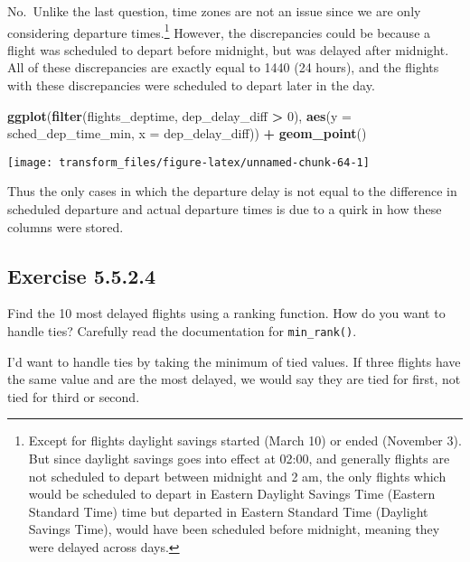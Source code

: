 \documentclass[]{book}
\newenvironment{Shaded}{\begin{snugshade}}{\end{snugshade}}
\newcommand{\DataTypeTok}[1]{\textcolor[rgb]{0.13,0.29,0.53}{#1}}
\newcommand{\DecValTok}[1]{\textcolor[rgb]{0.00,0.00,0.81}{#1}}
\newcommand{\KeywordTok}[1]{\textcolor[rgb]{0.13,0.29,0.53}{\textbf{#1}}}
\newcommand{\NormalTok}[1]{#1}
\newcommand{\OperatorTok}[1]{\textcolor[rgb]{0.81,0.36,0.00}{\textbf{#1}}}
\newcommand{\StringTok}[1]{\textcolor[rgb]{0.31,0.60,0.02}{#1}}
\let\rmarkdownfootnote\footnote%
\def\footnote{\protect\rmarkdownfootnote}
\theoremstyle{plain}
\theoremstyle{remark}
\begin{document}
No.~Unlike the last question, time zones are not an issue since we are
only considering departure times.\footnote{Except for flights daylight
  savings started (March 10) or ended (November 3). But since daylight
  savings goes into effect at 02:00, and generally flights are not
  scheduled to depart between midnight and 2 am, the only flights which
  would be scheduled to depart in Eastern Daylight Savings Time (Eastern
  Standard Time) time but departed in Eastern Standard Time (Daylight
  Savings Time), would have been scheduled before midnight, meaning they
  were delayed across days.} However, the discrepancies could be because
a flight was scheduled to depart before midnight, but was delayed after
midnight. All of these discrepancies are exactly equal to 1440 (24
hours), and the flights with these discrepancies were scheduled to
depart later in the day.

\begin{Shaded}
\begin{Highlighting}[]
\KeywordTok{ggplot}\NormalTok{(}\KeywordTok{filter}\NormalTok{(flights_deptime, dep_delay_diff }\OperatorTok{>}\StringTok{ }\DecValTok{0}\NormalTok{), }
       \KeywordTok{aes}\NormalTok{(}\DataTypeTok{y =}\NormalTok{ sched_dep_time_min, }\DataTypeTok{x =}\NormalTok{ dep_delay_diff)) }\OperatorTok{+}
\StringTok{  }\KeywordTok{geom_point}\NormalTok{()}
\end{Highlighting}
\end{Shaded}

\begin{center}\texttt{[image: transform\_files/figure-latex/unnamed-chunk-64-1]} \end{center}

Thus the only cases in which the departure delay is not equal to the
difference in scheduled departure and actual departure times is due to a
quirk in how these columns were stored.

\hypertarget{exercise-5.5.2.4}{%
\subsection*{\texorpdfstring{Exercise
{5.5.2.4}}{Exercise 5.5.2.4}}\label{exercise-5.5.2.4}}

Find the 10 most delayed flights using a ranking function. How do you
want to handle ties? Carefully read the documentation for
\texttt{min\_rank()}.

I'd want to handle ties by taking the minimum of tied values. If three
flights have the same value and are the most delayed, we would say they
are tied for first, not tied for third or second.
\end{document}
